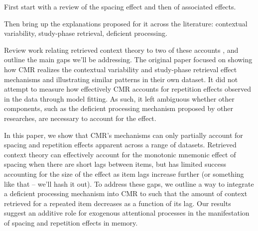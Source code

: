 First start with a review of the spacing effect and then of associated effects.

Then bring up the explanations proposed for it across the literature: contextual variability, study-phase retrieval, deficient processing.

Review work relating retrieved context theory to two of these accounts \citep{siegel2014retrieved}, and outline the main gaps we'll be addressing. The original paper focused on showing how CMR realizes the contextual variability and study-phase retrieval effect mechanisms and illustrating similar patterns in their own dataset. It did not attempt to measure how effectively CMR accounts for repetition effects observed in the data through model fitting. As such, it left ambiguous whether other components, such as the deficient processing mechanism proposed by other researches, are necessary to account for the effect.

In this paper, we show that CMR's mechanisms can only partially account for spacing and repetition effects apparent across a range of datasets. Retrieved context theory can effectively account for the monotonic mnemonic effect of spacing when there are short lags between items, but has limited success accounting for the size of the effect as item lags increase further (or something like that -- we'll hash it out). To address these gaps, we outline a way to integrate a deficient processing mechanism into CMR to such that the amount of context retrieved for a repeated item decreases as a function of its lag. Our results suggest an additive role for exogenous attentional processes in the manifestation of spacing and repetition effects in memory.